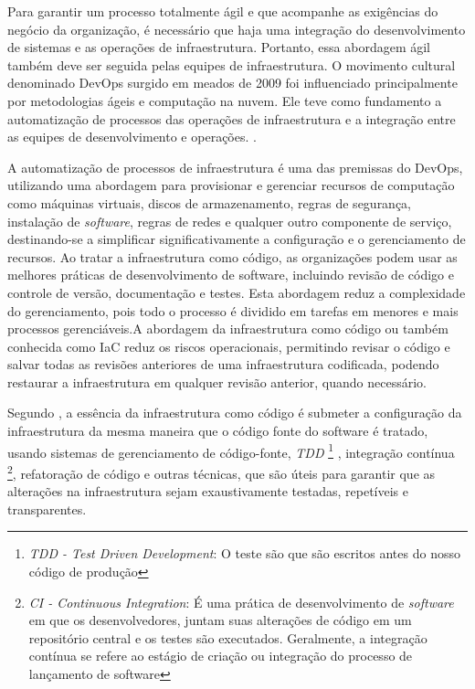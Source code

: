 Para garantir um processo totalmente ágil e que acompanhe as exigências do negócio da organização, é necessário que haja uma integração do desenvolvimento de sistemas e as operações de infraestrutura. Portanto, essa abordagem ágil também deve ser seguida pelas equipes de infraestrutura.
O movimento cultural denominado DevOps surgido em meados de 2009 foi influenciado principalmente por metodologias ágeis e computação na nuvem. Ele teve como fundamento a automatização de processos das operações de infraestrutura e a integração entre as equipes de desenvolvimento e operações. \cite{sato}.

A automatização de processos de infraestrutura é uma das premissas do DevOps, utilizando uma abordagem para provisionar e gerenciar recursos de computação como máquinas virtuais, discos de armazenamento, regras de segurança, instalação de \textit{software}, regras de redes e qualquer outro componente de serviço, destinando-se a simplificar significativamente a configuração e o gerenciamento de recursos. Ao tratar a infraestrutura como código, as organizações podem usar as melhores práticas de desenvolvimento de software, incluindo revisão de código e controle de versão, documentação e testes. Esta abordagem reduz a complexidade do gerenciamento, pois todo o processo é dividido em tarefas em menores e mais processos gerenciáveis.A abordagem da infraestrutura como código ou também conhecida como IaC reduz os riscos operacionais, permitindo revisar o código e salvar todas as revisões anteriores de uma infraestrutura codificada, podendo restaurar a infraestrutura em qualquer revisão anterior, quando necessário.

Segundo , a essência da infraestrutura como código é submeter a configuração da infraestrutura da mesma maneira que o código fonte do software é tratado, usando sistemas de gerenciamento de código-fonte, \textit{TDD} \footnote{\textit{TDD - Test Driven Development}: O teste são que são escritos antes do nosso código de produção} , integração contínua \footnote{\textit{CI - Continuous Integration}: É uma prática de desenvolvimento de \textit{software} em que os desenvolvedores, juntam suas alterações de código em um repositório central e os testes são executados. Geralmente, a integração contínua se refere ao estágio de criação ou integração do processo de lançamento de software  }, refatoração de código e outras técnicas, que são úteis para garantir que as alterações na infraestrutura sejam exaustivamente testadas, repetíveis e transparentes.

